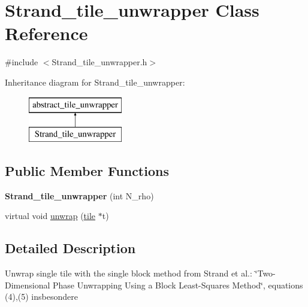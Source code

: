 \hypertarget{class_strand__tile__unwrapper}{\section{Strand\-\_\-tile\-\_\-unwrapper Class Reference}
\label{class_strand__tile__unwrapper}
}


{\ttfamily \#include $<$Strand\-\_\-tile\-\_\-unwrapper.\-h$>$}

Inheritance diagram for Strand\-\_\-tile\-\_\-unwrapper\-:\begin{figure}[H]
\begin{center}
\leavevmode
\includegraphics[height=2.000000cm]{class_strand__tile__unwrapper}
\end{center}
\end{figure}
\subsection*{Public Member Functions}
\begin{DoxyCompactItemize}
\item 
\hypertarget{class_strand__tile__unwrapper_afe8ff6109c61c4a150f4fdfd664459a4}{{\bfseries Strand\-\_\-tile\-\_\-unwrapper} (int N\-\_\-rho)}\label{class_strand__tile__unwrapper_afe8ff6109c61c4a150f4fdfd664459a4}

\item 
virtual void \hyperlink{class_strand__tile__unwrapper_a8a91a8867dc12db57db4f3960294f3ed}{unwrap} (\hyperlink{classtile}{tile} $\ast$t)
\end{DoxyCompactItemize}


\subsection{Detailed Description}
Unwrap single tile with the single block method from Strand et al.\-: \char`\"{}\-Two-\/\-Dimensional Phase Unwrapping Using a Block Least-\/\-Squares Method\char`\"{}, equations (4),(5) insbesondere 

